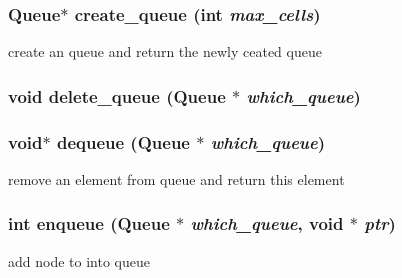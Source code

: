 \subsubsection{\setlength{\rightskip}{0pt plus 5cm}\bf{Queue}$\ast$ create\_\-queue (int {\em max\_\-cells})}\label{queue_8h_37f0ebf6bb3301f99bc42638a41ab12e}


create an queue and return the newly ceated queue 
\subsubsection{\setlength{\rightskip}{0pt plus 5cm}void delete\_\-queue (\bf{Queue} $\ast$ {\em which\_\-queue})}\label{queue_8h_b43c6f0104078cd018e97703f7b95ba7}


\subsubsection{\setlength{\rightskip}{0pt plus 5cm}void$\ast$ dequeue (\bf{Queue} $\ast$ {\em which\_\-queue})}\label{queue_8h_f8db386ebc4c0620589024d51d83f3b5}


remove an element from queue and return this element 
\subsubsection{\setlength{\rightskip}{0pt plus 5cm}int enqueue (\bf{Queue} $\ast$ {\em which\_\-queue}, void $\ast$ {\em ptr})}\label{queue_8h_b5f34276406bb4ca11d16f5d4c608b33}


add node to into queue 